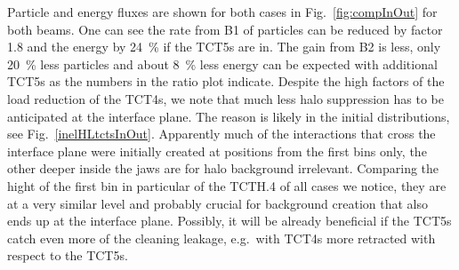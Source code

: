 Particle and energy fluxes are shown for both cases in Fig.~\ref{fig:compInOut} for both beams. One can see the rate from B1 of particles can be reduced by factor 1.8 and the energy by 24~\% if the TCT5s are in. The gain from B2 is less, only 20~\% less particles and about 8~\% less energy can be expected with additional TCT5s as the numbers in the ratio plot indicate. Despite the high factors of the load reduction of the TCT4s, we note that much less halo suppression has to be anticipated at the interface plane. The reason is likely in the initial distributions, see Fig.~\ref{inelHLtctsInOut}. Apparently much of the interactions that cross the interface plane were initially created at positions from the first bins only, the other deeper inside the jaws are for halo background irrelevant. Comparing the hight of the first bin in particular of the TCTH.4 of all cases we notice, they are at a very similar level and probably crucial for background creation that also ends up at the interface plane. Possibly, it will be already beneficial if the TCT5s catch even more of the cleaning leakage, e.g.~with TCT4s more retracted with respect to the TCT5s.





